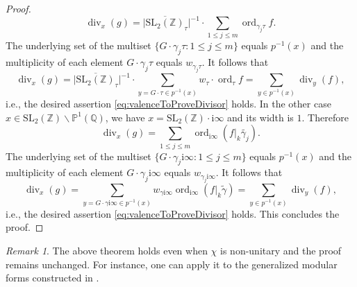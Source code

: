 \documentclass[12pt]{amsart}
\numberwithin{equation}{section}
\theoremstyle{plain}
\theoremstyle{definition}
\theoremstyle{remark}
\newtheorem{rema}[thm]{Remark}
\newcommand\rmi{\mathrm{i}}
\newcommand*\abs[1]{\lvert#1\rvert}
\newcommand\ord{\mathop{\mathrm{ord}}}
\renewcommand\div{\mathop{\mathrm{div}}}
\newcommand\projQ{\mathbb{P}^1(\mathbb{Q})}
\newcommand\slZ{\mathrm{SL}_2(\mathbb{Z})}
\begin{document}
\begin{proof}
\begin{equation*}
\div\nolimits_x(g)=\abs{\overline{\slZ}_\tau}^{-1}\cdot\sum_{1 \leq j \leq m}\ord\nolimits_{\gamma_j\tau} f.
\end{equation*}
The underlying set of the multiset $\{G\cdot\gamma_j\tau\colon 1 \leq j \leq m\}$ equals $p^{-1}(x)$ and the multiplicity of each element $G\cdot\gamma_j\tau$ equals $w_{\gamma_j\tau}$. It follows that
\begin{equation*}
\div\nolimits_x(g)=\abs{\overline{\slZ}_\tau}^{-1}\cdot\sum_{y=G\cdot\tau \in p^{-1}(x)}w_\tau\cdot\ord\nolimits_{\tau} f=\sum_{y\in p^{-1}(x)}\div\nolimits_{y}(f),
\end{equation*}
i.e., the desired assertion \eqref{eq:valenceToProveDivisor} holds. In the other case $x\in \slZ\backslash\projQ$, we have $x=\slZ\cdot\rmi\infty$ and its width is $1$. Therefore
\begin{equation*}
\div\nolimits_x(g)=\sum_{1 \leq j \leq m}\ord\nolimits_{\rmi\infty}(f\vert_k\widetilde{\gamma_j}).
\end{equation*}
The underlying set of the multiset $\{G\cdot\gamma_j\rmi\infty\colon 1 \leq j \leq m\}$ equals $p^{-1}(x)$ and the multiplicity of each element $G\cdot\gamma_j\rmi\infty$ equals $w_{\gamma_j\rmi\infty}$. It follows that
\begin{equation*}
\div\nolimits_x(g)=\sum_{y=G\cdot\gamma\rmi\infty\in p^{-1}(x)}w_{\gamma\rmi\infty}\ord\nolimits_{\rmi\infty}(f\vert_k\widetilde{\gamma})=\sum_{y\in p^{-1}(x)}\div\nolimits_{y}(f),
\end{equation*}
i.e., the desired assertion \eqref{eq:valenceToProveDivisor} holds. This concludes the proof.
\end{proof}

\begin{rema}
The above theorem holds even when $\chi$ is non-unitary and the proof remains unchanged. For instance, one can apply it to the generalized modular forms constructed in \cite{KM03}.
\end{rema}
\end{document}

